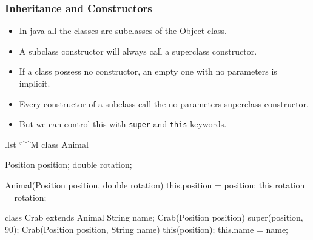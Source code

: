 \documentclass[10pt, handout]{beamer}
\makeatletter
\newenvironment{code}{%
  \begingroup
  \@bsphack
  \immediate\openout\lstvrb@out\jobname.lst
  \let\do\@makeother\dospecials\catcode`\^^M\active
  \def\verbatim@processline{%
    \immediate\write\lstvrb@out{\the\verbatim@line}}%
  \verbatim@start}{%
  \immediate\closeout\lstvrb@out
  \@esphack
  \endgroup
  
  \begin{alertblock}{}
    
  \end{alertblock}}
\makeatother
\begin{document}
\begin{frame}
  \frametitle{Inheritance and Constructors}
  \begin{itemize}
    \item In java all the classes are subclasses of the Object class. 
    \item A subclass constructor will always call a superclass constructor.
    \item If a class possess no constructor, an empty one with no parameters is implicit.
    \item Every constructor of a subclass call the no-parameters superclass constructor.
    \item But we can control this with \verb!super! and \verb!this! keywords.
  \end{itemize}
 \begin{center}
  \end{center}
\end{frame}

\begin{frame}
  \begin{code}
class Animal {
  Position position;
  double rotation;
    
  Animal(Position position, double rotation) {
    this.position = position;
    this.rotation = rotation;
  }
}

class Crab extends Animal{
  String name;
  Crab(Position position) {
    super(position, 90);
  }
  Crab(Position position, String name) {
    this(position);
    this.name = name;
  }
}
\end{code}
\end{frame}
\end{document}
